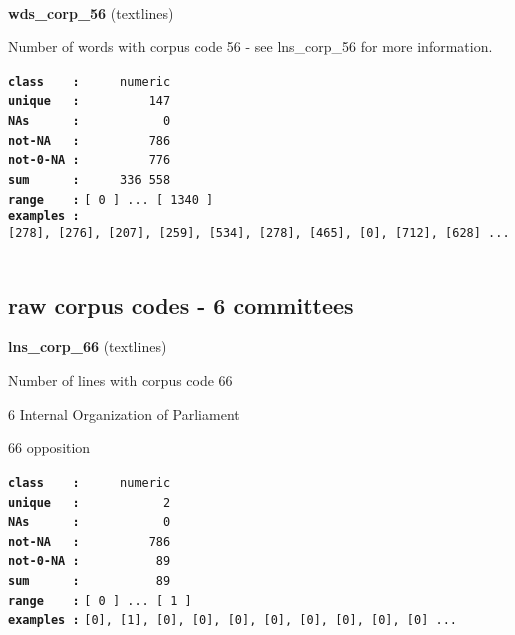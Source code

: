 \documentclass[]{article}
\begin{document}
~

\textbf{wds\_corp\_56} (textlines)

Number of words with corpus code 56 - see lns\_corp\_56 for more
information.

\textbf{\texttt{class\ \ \ \ :}} \texttt{~~~~~numeric}\\
\textbf{\texttt{unique\ \ \ :}} \texttt{~~~~~~~~~147}\\
\textbf{\texttt{NAs\ \ \ \ \ \ :}} \texttt{~~~~~~~~~~~0}\\
\textbf{\texttt{not-NA\ \ \ :}} \texttt{~~~~~~~~~786}\\
\textbf{\texttt{not-0-NA\ :}} \texttt{~~~~~~~~~776}\\
\textbf{\texttt{sum\ \ \ \ \ \ :}} \texttt{~~~~~336~558}\\
\textbf{\texttt{range\ \ \ \ :}}
\texttt{{[}\ 0\ {]}\ ...\ {[}\ 1340\ {]}}\\
\textbf{\texttt{examples\ :}}
\texttt{{[}278{]},\ {[}276{]},\ {[}207{]},\ {[}259{]},\ {[}534{]},\ {[}278{]},\ {[}465{]},\ {[}0{]},\ {[}712{]},\ {[}628{]}\ ...}\\

~

\subsection{raw corpus codes - 6
committees}\label{raw-corpus-codes---6-committees}

\textbf{lns\_corp\_66} (textlines)

Number of lines with corpus code 66

6 Internal Organization of Parliament

66 opposition

\textbf{\texttt{class\ \ \ \ :}} \texttt{~~~~~numeric}\\
\textbf{\texttt{unique\ \ \ :}} \texttt{~~~~~~~~~~~2}\\
\textbf{\texttt{NAs\ \ \ \ \ \ :}} \texttt{~~~~~~~~~~~0}\\
\textbf{\texttt{not-NA\ \ \ :}} \texttt{~~~~~~~~~786}\\
\textbf{\texttt{not-0-NA\ :}} \texttt{~~~~~~~~~~89}\\
\textbf{\texttt{sum\ \ \ \ \ \ :}} \texttt{~~~~~~~~~~89}\\
\textbf{\texttt{range\ \ \ \ :}}
\texttt{{[}\ 0\ {]}\ ...\ {[}\ 1\ {]}}\\
\textbf{\texttt{examples\ :}}
\texttt{{[}0{]},\ {[}1{]},\ {[}0{]},\ {[}0{]},\ {[}0{]},\ {[}0{]},\ {[}0{]},\ {[}0{]},\ {[}0{]},\ {[}0{]}\ ...}\\
\end{document}
